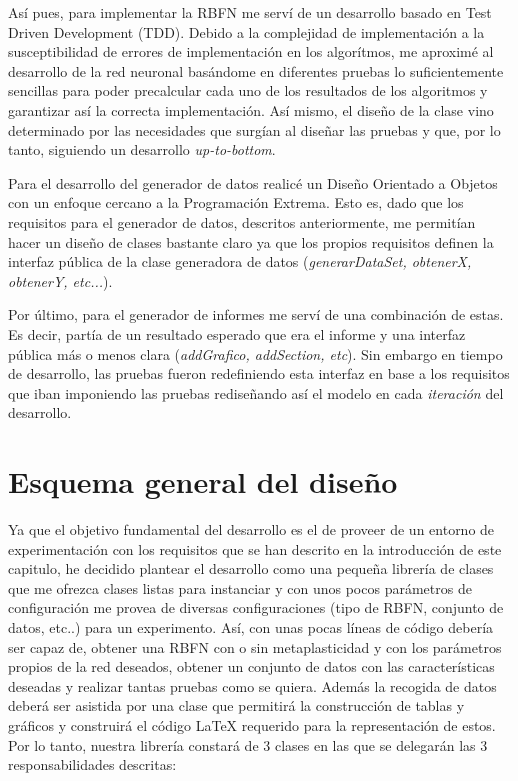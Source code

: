 \documentclass[10pt,a4paper]{report}
\begin{document}
Así pues, para implementar la RBFN me serví de un desarrollo basado en Test Driven Development (TDD). Debido a la complejidad de implementación a la susceptibilidad de errores de implementación en los algorítmos, me aproximé al desarrollo de la red neuronal basándome en diferentes pruebas lo suficientemente sencillas para poder precalcular cada uno de los resultados de los algoritmos y garantizar así la correcta implementación. Así mismo, el diseño de la clase vino determinado por las necesidades que surgían al diseñar las pruebas y que, por lo tanto, siguiendo un desarrollo \textit{up-to-bottom}.

Para el desarrollo del generador de datos realicé un Diseño Orientado a Objetos con un enfoque cercano a la Programación Extrema. Esto es, dado que los requisitos para el generador de datos, descritos anteriormente, me permitían hacer un diseño de clases bastante claro ya que los propios requisitos definen la interfaz pública de la clase generadora de datos (\textit{generarDataSet, obtenerX, obtenerY, etc...}).

Por último, para el generador de informes me serví de una combinación de estas. Es decir, partía de un resultado esperado que era el informe y una interfaz pública más o menos clara (\textit{addGrafico, addSection, etc}). Sin embargo en tiempo de desarrollo, las pruebas fueron redefiniendo esta interfaz en base a los requisitos que iban imponiendo las pruebas rediseñando así el modelo en cada \textit{iteración} del desarrollo.

\section{Esquema general del diseño}
Ya que el objetivo fundamental del desarrollo es el de proveer de un entorno de experimentación con los requisitos que se han descrito en la introducción de este capitulo, he decidido plantear el desarrollo como una pequeña librería de clases que me ofrezca clases listas para instanciar y con unos pocos parámetros de configuración me provea de diversas configuraciones (tipo de RBFN, conjunto de datos, etc..) para un experimento. Así, con unas pocas líneas de código debería ser capaz de, obtener una RBFN con o sin metaplasticidad y con los parámetros propios de la red deseados, obtener un conjunto de datos con las características deseadas y realizar tantas pruebas como se quiera. Además la recogida de datos deberá ser asistida por una clase que permitirá la construcción de tablas y gráficos y construirá el código LaTeX requerido para la representación de estos.
Por lo tanto, nuestra librería constará de 3 clases en las que se delegarán las 3 responsabilidades descritas:
\end{document}
